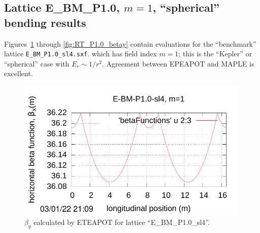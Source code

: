\documentclass[]{article}
\begin{document}
\subsection{Lattice E\_BM\_P1.0, $m=1$, ``spherical'' bending results}
Figures~\ref{fig:UAL_P1.0_betax} through \ref{fig:RT_P1.0_betay}
contain evaluations
for the ``benchmark'' lattice {\tt E\_BM\_P1.0\_sl4.sxf}. 
which has field index $m=1$; this is the ``Kepler'' or
``spherical'' case with $E_r\sim1/r^2$.
Agreement between EPEAPOT and MAPLE is excellent.
%
\begin{figure}[htbp]
\hspace{-0.6cm}
\begin{minipage}[b]{0.49\linewidth}
\centering
\includegraphics[scale=0.6]{pdf/Fig_II-1.pdf}
\caption{$\beta_y$ calculated by ETEAPOT for lattice ``E\_BM\_P1.0\_sl4''.}
\label{fig:UAL_P1.0_betax}
\end{minipage}
%
%
\begin{minipage}[b]{0.49\linewidth}
\centering

\end{minipage}
\end{figure}
\end{document}
